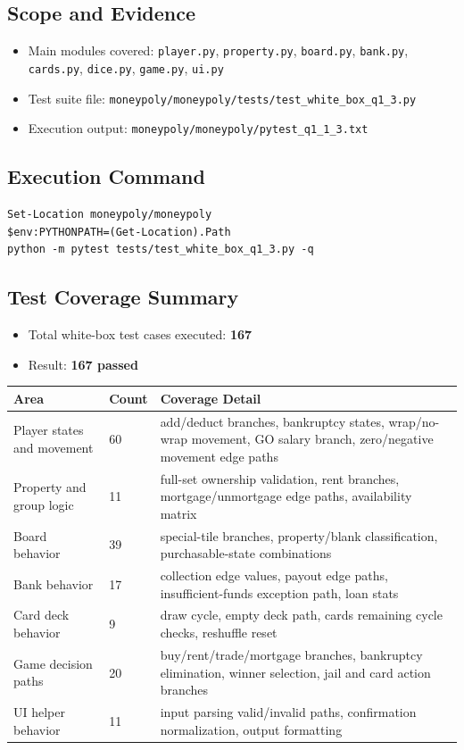 \documentclass[11pt,a4paper]{article}
\begin{document}
\subsection*{Scope and Evidence}
\begin{itemize}
  \item Main modules covered: \texttt{player.py}, \texttt{property.py}, \texttt{board.py}, \texttt{bank.py}, \texttt{cards.py}, \texttt{dice.py}, \texttt{game.py}, \texttt{ui.py}
  \item Test suite file: \texttt{moneypoly/moneypoly/tests/test\_white\_box\_q1\_3.py}
  \item Execution output: \texttt{moneypoly/moneypoly/pytest\_q1\_1\_3.txt}
\end{itemize}

\subsection*{Execution Command}
\begin{verbatim}
Set-Location moneypoly/moneypoly
$env:PYTHONPATH=(Get-Location).Path
python -m pytest tests/test_white_box_q1_3.py -q
\end{verbatim}

\subsection*{Test Coverage Summary}
\begin{itemize}
  \item Total white-box test cases executed: \textbf{167}
  \item Result: \textbf{167 passed}
\end{itemize}

\begin{longtable}{|p{}|p{}|p{}|}
\hline
\textbf{Area} & \textbf{Count} & \textbf{Coverage Detail} \\
\hline
Player states and movement & 60 & add/deduct branches, bankruptcy states, wrap/no-wrap movement, GO salary branch, zero/negative movement edge paths \\
\hline
Property and group logic & 11 & full-set ownership validation, rent branches, mortgage/unmortgage edge paths, availability matrix \\
\hline
Board behavior & 39 & special-tile branches, property/blank classification, purchasable-state combinations \\
\hline
Bank behavior & 17 & collection edge values, payout edge paths, insufficient-funds exception path, loan stats \\
\hline
Card deck behavior & 9 & draw cycle, empty deck path, cards remaining cycle checks, reshuffle reset \\
\hline
Game decision paths & 20 & buy/rent/trade/mortgage branches, bankruptcy elimination, winner selection, jail and card action branches \\
\hline
UI helper behavior & 11 & input parsing valid/invalid paths, confirmation normalization, output formatting \\
\hline
\end{longtable}
\end{document}
